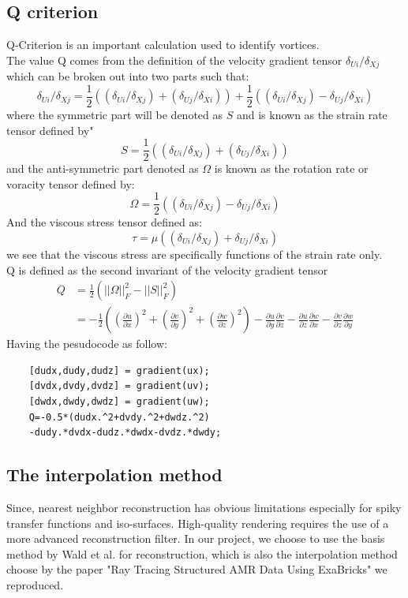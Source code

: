 \documentclass[acmtog]{acmart}
\begin{document}
\subsection{Q criterion}
Q-Criterion is an important calculation used to identify vortices.\\
The value Q comes from the definition of the velocity gradient tensor $\delta_{Ui}/\delta_{Xj}$ which can be 
broken out into two parts such that:
$$\delta_{Ui}/\delta_{Xj}=\frac{1}{2}((\delta_{Ui}/\delta_{Xj})+(\delta_{Uj}/\delta_{Xi}))+
\frac{1}{2}((\delta_{Ui}/\delta_{Xj})-\delta_{Uj}/\delta_{Xi})$$
where the symmetric part will be denoted as $S$ and is known as the strain rate tensor defined by"
$$S=\frac{1}{2}((\delta_{Ui}/\delta_{Xj})+(\delta_{Uj}/\delta_{Xi}))$$
and the anti-symmetric part denoted as $\Omega$ is known as the rotation rate or voracity tensor 
defined by:
$$\Omega=\frac{1}{2}((\delta_{Ui}/\delta_{Xj})-\delta_{Uj}/\delta_{Xi})$$
And the viscous stress tensor defined as:
$$\tau =\mu((\delta_{Ui}/\delta_{Xj})+\delta_{Uj}/\delta_{Xi})$$
we see that the viscous stress are specifically functions of the strain rate only.\\
Q is defined as the second invariant of the velocity gradient tensor
$$\begin{aligned}
	Q&=\frac{1}{2}(||\Omega||_F^2-||S||_F^2)\\
	&=-\frac{1}{2}((\frac{\partial u}{\partial x})^2+(\frac{\partial v}{\partial y})^2+
	(\frac{\partial w}{\partial z})^2)-\frac{\partial u}{\partial y}\frac{\partial v}{\partial z}-
	\frac{\partial u}{\partial z}\frac{\partial w}{\partial x}-\frac{\partial v}{\partial z}\frac{\partial w}{\partial y}
\end{aligned}
$$
Having the pesudocode as follow:
\begin{lstlisting}
	[dudx,dudy,dudz] = gradient(ux);
	[dvdx,dvdy,dvdz] = gradient(uv);
	[dwdx,dwdy,dwdz] = gradient(uw);
	Q=-0.5*(dudx.^2+dvdy.^2+dwdz.^2)
	-dudy.*dvdx-dudz.*dwdx-dvdz.*dwdy;
\end{lstlisting}


\subsection{The interpolation method}


Since, nearest neighbor reconstruction has obvious limitations especially for spiky transfer functions and iso-surfaces. High-quality rendering requires the use of a more advanced reconstruction filter. In our project, we choose to use the basis method by Wald et al. for reconstruction, which is also the interpolation method choose by the paper "Ray Tracing Structured AMR Data Using ExaBricks" we reproduced.
\end{document}

